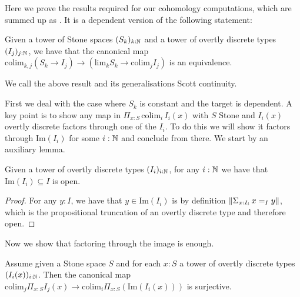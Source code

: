 Here we prove the results required for our cohomology computations, which are summed up as . It is a dependent version of the following statement: 

\begin{goal}%
Given a tower of Stone spaces $(S_k)_{k:\mathbb{N}}$ and a tower of overtly discrete types $(I_j)_{j:\mathbb{N}}$, we have that the canonical map $\mathrm{colim}_{k,j}(S_k\to I_j) \to (\mathrm{lim}_k S_k\to \mathrm{colim}_j I_j)$ is an equivalence.
\end{goal}

\begin{remark}
We call the above result and its generalisations Scott continuity. 
\end{remark}

First we deal with the case where $S_k$ is constant and the target is dependent. A key point is to show any map in $\Pi_{x:S}\, \mathrm{colim}_i\, I_i(x)$ with $S$ Stone and $I_i(x)$ overtly discrete factors through one of the $I_i$. To do this we will show it factors through $\mathrm{Im}(I_i)$ for some $i:\mathbb{N}$ and conclude from there. We start by an auxiliary lemma.

\begin{lemma}\label{overtly-discrete-union-open}
Given a tower of overtly discrete types $(I_i)_{i:\mathbb{N}}$, for any $i:\mathbb{N}$ we have that $\mathrm{Im}(I_i)\subseteq I$ is open. 
\end{lemma}

\begin{proof}
 For any $y:I$, we have that $y\in \mathrm{Im}(I_i)$ is by definition $\lVert \Sigma_{x:I_i}\, x=_{I}y \rVert$,
which is the propositional truncation of an overtly discrete type and therefore open.
\end{proof}

Now we show that factoring through the image is enough.

\begin{lemma}\label{factorisation-image-true-factorisation}
  Assume given a Stone space $S$ and for each $x:S$ a tower of overtly discrete types $(I_i(x))_{i:\mathbb{N}}$. 
  Then the canonical map $ \mathrm{colim}_j\Pi_{x:S} I_j(x) \to 
  \mathrm{colim}_i \Pi_{x:S} (\mathrm{Im} (I_i(x)))$ is surjective. 

\end{lemma}

